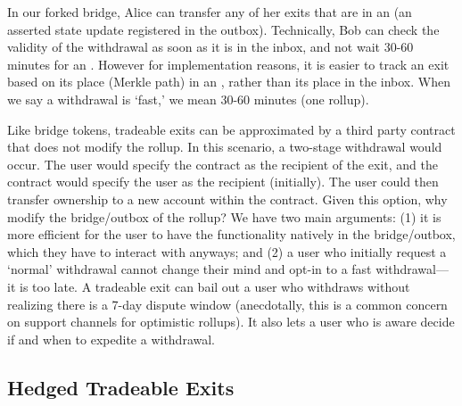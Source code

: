 In our forked bridge, Alice can transfer any of her exits that are in an \rblock (\ie an asserted \layertwo state update registered in the outbox). Technically, Bob can check the validity of the withdrawal as soon as it is in the inbox, and not wait 30-60 minutes for an \rblock. However for implementation reasons, it is easier to track an exit based on its place (\ie Merkle path) in an \rblock, rather than its place in the inbox. When we say a withdrawal is `fast,' we mean 30-60 minutes (\ie one \layertwo rollup). 

Like bridge tokens, tradeable exits can be approximated by a third party \layerone contract that does not modify the rollup. In this scenario, a two-stage withdrawal would occur. The user would specify the contract as the recipient of the exit, and the contract would specify the user as the recipient (initially). The user could then transfer ownership to a new account within the contract. Given this option, why modify the bridge/outbox of the rollup? We have two main arguments: (1) it is more efficient for the user to have the functionality natively in the bridge/outbox, which they have to interact with anyways; and (2) a user who initially request a `normal' withdrawal cannot change their mind and opt-in to a fast withdrawal---it is too late. A tradeable exit can bail out a user who withdraws without realizing there is a 7-day dispute window (anecdotally, this is a common concern on support channels for optimistic rollups). It also lets a user who is aware decide if and when to expedite a withdrawal. 

\subsection{Hedged Tradeable Exits}
\label{sec:PM}

